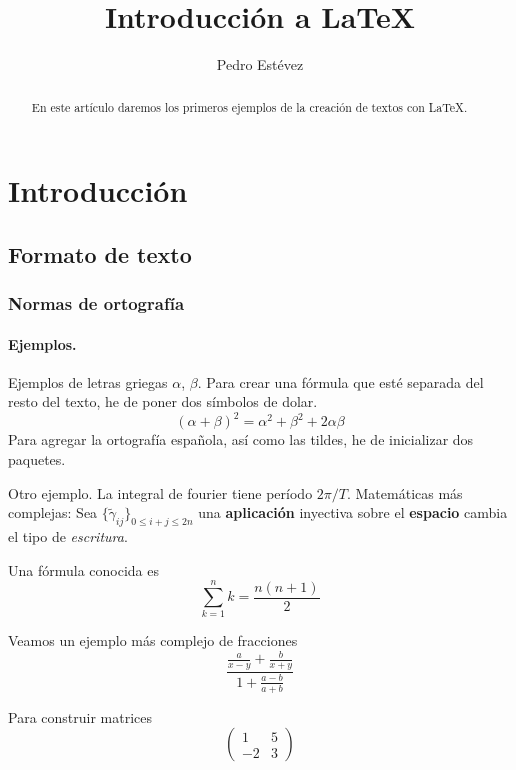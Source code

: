 \documentclass{article}
\begin{document}
\tableofcontents
\title{Introducción a LaTeX}
\author{Pedro Estévez}
\maketitle

\begin{abstract}
En este artículo daremos los primeros ejemplos de la creación de textos con LaTeX.
\end{abstract}

\section{Introducción}
\subsection{Formato de texto}
\subsubsection{Normas de ortografía} %
\paragraph{Ejemplos.}

Ejemplos de letras griegas $\alpha$, $\beta$. 
Para crear una fórmula que esté separada del resto del texto, he de poner dos símbolos de dolar.
 $$(\alpha+\beta)^2=\alpha^2+\beta^2+2\alpha\beta$$
Para agregar la ortografía española, así como las tildes, he de inicializar dos paquetes.\bigskip

Otro ejemplo. La integral de fourier tiene período $2\pi/T$.
Matemáticas más complejas: 
Sea $\{\tilde{\gamma}_{ij}\}_{0\leq i+j \leq 2n}$ una \textbf{aplicación} inyectiva sobre el {\bf espacio} cambia el tipo de \emph{escritura}.\bigskip

Una fórmula conocida es $$\sum_{k=1}^n k=\frac{n(n+1)}{2}$$

Veamos un ejemplo más complejo de fracciones 
$$\frac{\frac{a}{x-y}+\frac{b}{x+y}}{1+\frac{a-b}{a+b}}$$

Para construir matrices 
$$\begin{pmatrix}
1&5\\
-2&3
\end{pmatrix}$$ %
\end{document}
